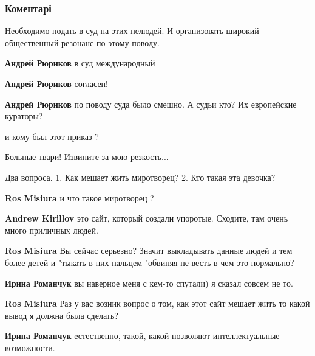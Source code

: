  
 
 
 
 
\subsubsection{Коментарі}

\begin{itemize} %
Необходимо подать в суд на этих нелюдей. И организовать широкий общественный резонанс по этому поводу.

\begin{itemize} %
\textbf{Андрей Рюриков} в суд международный

\textbf{Андрей Рюриков} согласен!

\textbf{Андрей Рюриков} по поводу суда было смешно. А судьи кто? Их европейские кураторы?

и кому был этот приказ ?
\end{itemize} %

Больные твари!
Извините за мою резкость...

Два вопроса.
1. Как мешает жить миротворец?
2. Кто такая эта девочка?

\begin{itemize} %
\textbf{Ros Misiura} и что такое миротворец ?

\textbf{Andrew Kirillov} это сайт, который создали упоротые. Сходите, там очень много приличных людей.

\textbf{Ros Misiura} Вы сейчас серьезно? Значит выкладывать данные людей и тем более детей и "тыкать в них пальцем "обвиняя не весть в чем это нормально?

\textbf{Ирина Романчук} вы наверное меня с кем-то спутали) я сказал совсем не то.

\textbf{Ros Misiura} Раз у вас возник вопрос о том, как этот сайт мешает жить то какой вывод я должна была сделать?

\textbf{Ирина Романчук} естественно, такой, какой позволяют интеллектуальные возможности.


\end{itemize}
\end{itemize}
